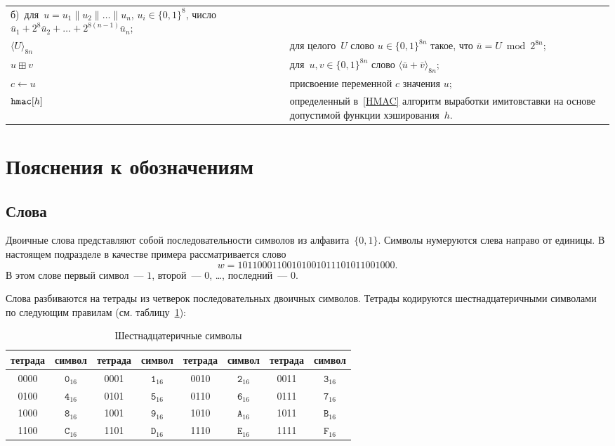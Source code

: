{\begin{longtable}{lrp{13.5cm}}
б)~для~$u=u_1\parallel u_2\parallel\ldots\parallel u_n$, $u_i\in\{0,1\}^8$,
число~$\bar u_1+2^8\bar u_2+\ldots+2^{8(n-1)}\bar u_n$;
\\[4pt]
%
$\langle U\rangle_{8n}$ &&
для целого~$U$ 
слово $u\in\{0,1\}^{8n}$ такое, что $\bar u=U\bmod 2^{8n}$;
\\[4pt]
%
$u\boxplus v$           &&
для~$u,v\in\{0,1\}^{8n}$ слово $\langle\bar u+\bar v\rangle_{8n}$;
\\[4pt]
%
$c\leftarrow u$         &&
присвоение переменной $c$ значения $u$;
\\[4pt]
%
$\texttt{hmac}[h]$         &&
определенный в~\ref{HMAC}
алгоритм выработки имитовставки на основе 
допустимой функции хэширования~$h$.
\end{longtable}
} %
\setcounter{table}{0}

\section{Пояснения к обозначениям}

\subsection{Слова}

Двоичные слова представляют собой последовательности символов из 
алфавита~$\{0,1\}$. Символы нумеруются слева направо от единицы.
%
В настоящем подразделе в качестве примера рассматривается слово
$$
w=1011 0001 1001 0100 1011 1010 1100 1000.
$$
В этом слове первый символ~--- $1$, 
второй~--- $0$, \ldots, последний~--- $0$.

Слова разбиваются на тетрады из четверок последовательных двоичных символов.
%
Тетрады кодируются шестнадцатеричными символами по следующим правилам
(см. таблицу~\ref{Table.Hex}):

\begin{table}[h]
\caption{Шестнадцатеричные символы}\label{Table.Hex}
\begin{tabular}{|c|c||c|c||c|c||c|c|}
\hline
тетрада & символ & тетрада & символ & тетрада & символ & тетрада & символ\\
\hline
\hline
0000 & $\texttt{0}_{16}$ & 0001 & $\texttt{1}_{16}$ & 
0010 & $\texttt{2}_{16}$ & 0011 & $\texttt{3}_{16}$\\
0100 & $\texttt{4}_{16}$ & 0101 & $\texttt{5}_{16}$ & 
0110 & $\texttt{6}_{16}$ & 0111 & $\texttt{7}_{16}$\\ 
1000 & $\texttt{8}_{16}$ & 1001 & $\texttt{9}_{16}$ & 
1010 & $\texttt{A}_{16}$ & 1011 & $\texttt{B}_{16}$\\ 
1100 & $\texttt{C}_{16}$ & 1101 & $\texttt{D}_{16}$ & 
1110 & $\texttt{E}_{16}$ & 1111 & $\texttt{F}_{16}$\\ 
\hline
\end{tabular}
\end{table}

